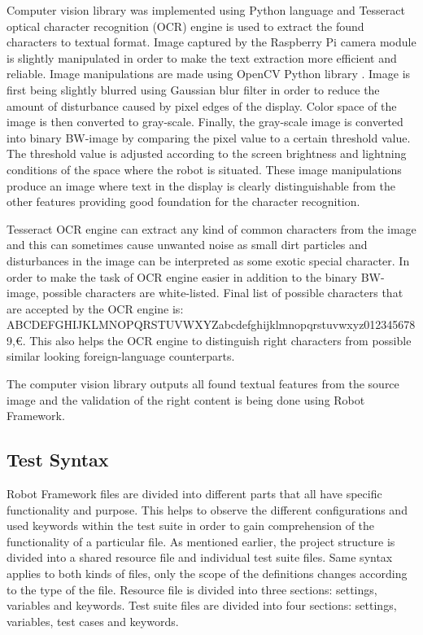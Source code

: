 Computer vision library was implemented using Python language and Tesseract optical character recognition (OCR) engine is used to extract the found characters to textual format. Image captured by the Raspberry Pi camera module is slightly manipulated in order to make the text extraction more efficient and reliable. Image manipulations are made using OpenCV Python library \citep{opencv}. Image is first being slightly blurred using Gaussian blur filter in order to reduce the amount of disturbance caused by pixel edges of the display. Color space of the image is then converted to gray-scale. Finally, the gray-scale image is converted into binary BW-image by comparing the pixel value to a certain threshold value. The threshold value is adjusted according to the screen brightness and lightning conditions of the space where the robot is situated. These image manipulations produce an image where text in the display is clearly distinguishable from the other features providing good foundation for the character recognition.

Tesseract OCR engine can extract any kind of common characters from the image and this can sometimes cause unwanted noise as small dirt particles and disturbances in the image can be interpreted as some exotic special character. In order to make the task of OCR engine easier in addition to the binary BW-image, possible characters are white-listed. Final list of possible characters that are accepted by the OCR engine is: ABCDEFGHIJKLMNOPQRSTUVWXYZabcdefghijklmnopqrstuvwxyz0123456789,\euro. This also helps the OCR engine to distinguish right characters from possible similar looking foreign-language counterparts.

The computer vision library outputs all found textual features from the source image and the validation of the right content is being done using Robot Framework. 

\subsection{Test Syntax}
\label{subsection:Test syntax}

Robot Framework files are divided into different parts that all have specific functionality and purpose. This helps to observe the different configurations and used keywords within the test suite in order to gain comprehension of the functionality of a particular file. As mentioned earlier, the project structure is divided into a shared resource file and individual test suite files. Same syntax applies to both kinds of files, only the scope of the definitions changes according to the type of the file. Resource file is divided into three sections: settings, variables and keywords. Test suite files are divided into four sections: settings, variables, test cases and keywords.

